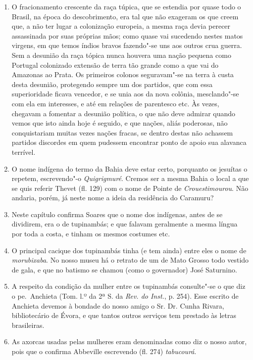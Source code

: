 \begin{enumerate}
\item  O fracionamento crescente da raça túpica, que se estendia por
quase todo o Brasil, na época do descobrimento, era tal que não exageram
os que creem que, a não ter lugar a colonização europeia, a mesma raça devia
perecer assassinada por suas próprias mãos; como quase vai sucedendo nestes
matos virgens, em que temos índios bravos fazendo"-se uns aos outros crua
guerra. Sem a desunião da raça tópica nunca houvera uma nação pequena
como Portugal colonizado extensão de terra tão grande como a que vai do
Amazonas ao Prata. Os primeiros colonos seguravam"-se na terra à custa
desta desunião, protegendo sempre um dos partidos, que com essa superioridade 
ficava vencedor, e se unia aos da nova colônia, mesclando"-se com ela
em interesses, e até em relações de parentesco etc. Às vezes, chegavam a
fomentar a desunião política, o que não deve admirar quando vemos que isto ainda 
hoje é seguido, e que nações, aliás poderosas, não conquistariam muitas vezes nações 
fracas, se dentro destas não achassem partidos discordes em quem pudessem encontrar ponto 
de apoio sua alavanca terrível.

\item O nome indígena do termo da Bahia deve estar certo, porquanto os jesuítas o 
repetem, escrevendo"-o \textit{Quigrigmuré}. Cremos ser a mesma Bahia o local a que se 
quis referir Thevet (fl. 129) com o nome de Pointe de \textit{Crouestimourou}. Não andaria, 
porém, já neste nome a ideia da residência do Caramuru?

\item Neste capítulo confirma Soares que o nome dos indígenas, antes de se dividirem, 
era o de tupinambás; e que falavam geralmente a mesma língua por toda a costa, e 
tinham os mesmos costumes etc.

\item O principal cacique dos tupinambás tinha (e tem ainda) entre eles o nome de 
\textit{morubixaba}. No nosso museu há o retrato de um de Mato Grosso todo vestido de gala, 
e que no batismo se chamou (como o governador) José Saturnino.

\item A respeito da condição da mulher entre os tupinambás consulte"-se o que diz o 
pe.~Anchieta (Tom. l.º da 2ª S. da \textit{Rev. do Inst.}, p. 254). Esse escrito de Anchieta devemos 
à bondade do nosso amigo o Sr. Dr. Cunha Rivara, bibliotecário de Évora, e que tantos 
outros serviços tem prestado às letras brasileiras.

\item As axorcas usadas pelas mulheres eram denominadas como diz o nosso autor, pois 
que o confirma Abbeville escrevendo (fl. 274) \textit{tabucourá}.


\end{enumerate}
